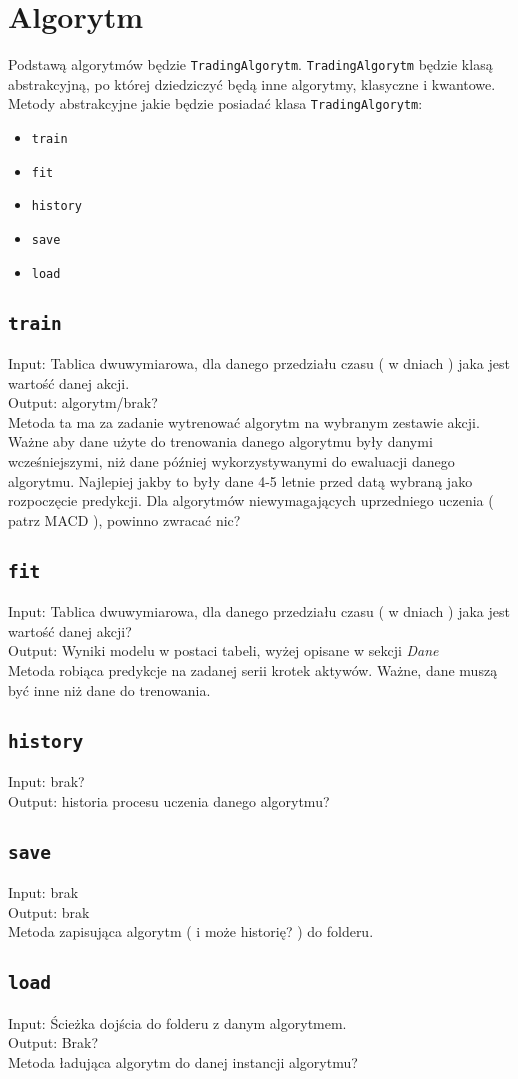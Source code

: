 \documentclass[polish,envcountsect,10pt]{article}
\begin{document}
\section{Algorytm}

Podstawą algorytmów będzie \texttt{TradingAlgorytm}. \texttt{TradingAlgorytm}  będzie klasą abstrakcyjną, po której dziedziczyć będą inne algorytmy, klasyczne i kwantowe.
Metody abstrakcyjne jakie będzie posiadać klasa \texttt{TradingAlgorytm}:
\begin{itemize}
    \item \texttt{train}
    \item\texttt{fit}
    \item \texttt{history}
    \item \texttt{save}
    \item \texttt{load}
\end{itemize}


\subsection{\texttt{train}}
Input: Tablica dwuwymiarowa, dla danego przedziału czasu ( w dniach ) jaka jest wartość danej akcji.\\
Output: algorytm/brak?\\
Metoda ta ma za zadanie wytrenować algorytm na wybranym zestawie akcji. 
Ważne aby dane użyte do trenowania danego algorytmu były danymi wcześniejszymi, niż dane później wykorzystywanymi do ewaluacji danego algorytmu.
Najlepiej jakby to były dane 4-5 letnie przed datą wybraną jako rozpoczęcie predykcji.
Dla algorytmów niewymagających uprzedniego uczenia ( patrz MACD ), powinno zwracać nic?
\subsection{\texttt{fit}}
Input: Tablica dwuwymiarowa, dla danego przedziału czasu ( w dniach ) jaka jest wartość danej akcji?\\
Output: Wyniki modelu w postaci tabeli, wyżej opisane w sekcji \emph{Dane}\\
Metoda robiąca predykcje na zadanej serii krotek aktywów.
Ważne, dane muszą być inne niż dane do trenowania.
\subsection{\texttt{history}}
Input: brak?\\
Output: historia procesu uczenia danego algorytmu?
\subsection{\texttt{save}}
Input: brak\\
Output: brak\\
Metoda zapisująca algorytm ( i może historię? ) do folderu. 
\subsection{\texttt{load}}
Input: Ścieżka dojścia do folderu z danym algorytmem.\\
Output: Brak?\\
Metoda ładująca algorytm do danej instancji algorytmu?
\end{document}
